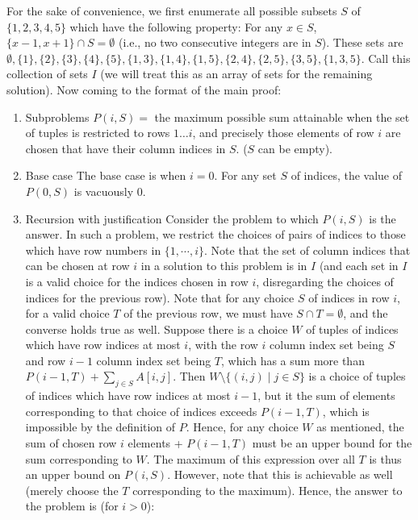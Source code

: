 For the sake of convenience, we first enumerate all possible subsets $S$ of $\{1, 2, 3, 4, 5\}$ which have the following property: For any $x \in S$, $\{x - 1, x + 1\} \cap S = \emptyset$ (i.e., no two consecutive integers are in $S$). \nl
These sets are $\emptyset, \{1\}, \{2\}, \{3\}, \{4\}, \{5\}, \{1, 3\}, \{1, 4\}, \{1, 5\}, \{2, 4\}, \{2, 5\}, \{3, 5\}, \{1, 3, 5\}$.\nl
Call this collection of sets $I$ (we will treat this as an array of sets for the remaining solution).\nl
Now coming to the format of the main proof:
\begin{enumerate}
\item Subproblems\nl
$P(i, S) = $ the maximum possible sum attainable when the set of tuples is restricted to rows $1\ldots i$, and precisely those elements of row $i$ are chosen that have their column indices in $S$. ($S$ can be empty).
\item Base case\nl
The base case is when $i = 0$. For any set $S$ of indices, the value of $P(0, S)$ is vacuously $0$.
\item Recursion with justification\nl
Consider the problem to which $P(i, S)$ is the answer. In such a problem, we restrict the choices of pairs of indices to those which have row numbers in $\{1, \cdots, i\}$.\nl
Note that the set of column indices that can be chosen at row $i$ in a solution to this problem is in $I$ (and each set in $I$ is a valid choice for the indices chosen in row $i$, disregarding the
choices of indices for the previous row). Note that for any choice $S$ of indices in row $i$, for a valid choice $T$ of the previous row, we must have $S \cap T = \emptyset$, and the converse holds true as well.\nl
Suppose there is a choice $W$ of tuples of indices which have row indices at most $i$, with the row $i$ column index set being $S$ and row $i - 1$ column index set being $T$, which has a sum more than $P(i - 1, T) + \sum_{j \in S} A[i, j]$. Then $W \setminus \{(i, j) \mid j \in S\}$ is a choice of tuples of indices which have row indices at most $i - 1$, but it the sum of elements corresponding to that choice of indices exceeds $P(i - 1, T)$, which is impossible by the definition of $P$. Hence, for any choice $W$ as mentioned, the sum of chosen row $i$ elements + $P(i - 1, T)$ must be an upper bound for the sum corresponding to $W$. The maximum of this expression over all $T$ is thus an upper bound on $P(i, S)$. However, note that this is achievable as well (merely choose the $T$ corresponding to the maximum).\nl
Hence, the answer to the problem is (for $i > 0$):
\begin{align*}

\end{align*}
\end{enumerate}
